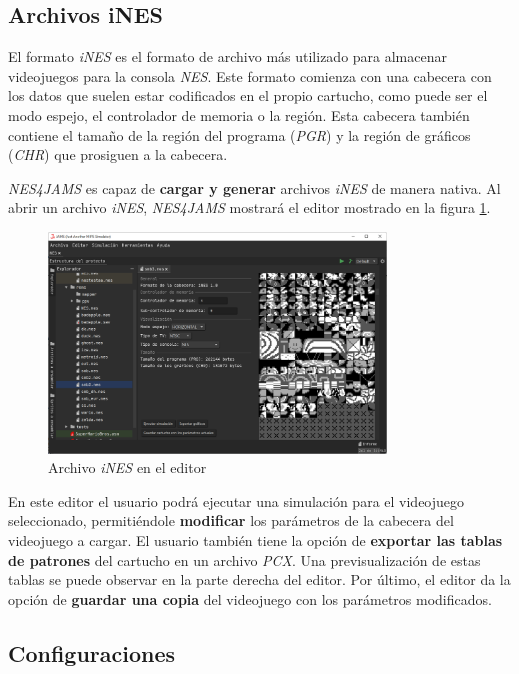 \subsection{Archivos iNES}\label{subsec:archivos-nes}

El formato \textit{iNES} es el formato de archivo más utilizado
para almacenar videojuegos para la consola \textit{NES}.
Este formato comienza con una cabecera con los datos que suelen
estar codificados en el propio cartucho, como puede ser el modo
espejo, el controlador de memoria o la región.
Esta cabecera también contiene el tamaño de la región del
programa (\textit{PGR}) y la región de gráficos (\textit{CHR})
que prosiguen a la cabecera.

\textit{NES4JAMS} es capaz de \textbf{cargar y generar} archivos
\textit{iNES} de manera nativa.
Al abrir un archivo \textit{iNES}, \textit{NES4JAMS} mostrará
el editor mostrado en la figura \ref{fig:nes-ines-editor}.

\begin{figure}[h]
    \centering
    \includegraphics[width=0.8\textwidth]{images/nes/nes-ines-editor}
    \caption{Archivo \textit{iNES} en el editor}
    \label{fig:nes-ines-editor}
\end{figure}

En este editor el usuario podrá ejecutar una simulación
para el videojuego seleccionado, permitiéndole \textbf{modificar}
los parámetros de la cabecera del videojuego a cargar.
El usuario también tiene la opción de \textbf{exportar las tablas
de patrones} del cartucho en un archivo \textit{PCX}.
Una previsualización de estas tablas se puede observar en la parte
derecha del editor.
Por último, el editor da la opción de \textbf{guardar una copia}
del videojuego con los parámetros modificados.

\subsection{Configuraciones}\label{subsec:configuraciones}

